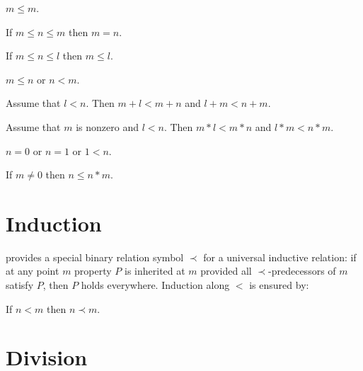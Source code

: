 \documentclass[11pt]{article}
\begin{document}
\begin{forthel}

\begin{lemma} $m \leq m$.
\end{lemma}

\begin{lemma} If $m \leq n \leq m$ 
then $m = n$.
\end{lemma}

\begin{lemma} If $m \leq n \leq l$ 
then  $m \leq l$.
\end{lemma}

\begin{axiom} $m \leq n$ or $n < m$.
\end{axiom}

\begin{lemma} Assume that $l < n$.
  Then $m + l < m + n$ and $l + m < n + m$.
\end{lemma}

\begin{lemma} Assume that $m$ is nonzero and $l < n$.
  Then $m * l < m * n$ and $l * m < n * m$.
\end{lemma}

\begin{axiom} $n = 0$ or $n = 1$ or $1 < n$.
\end{axiom}

\begin{lemma} If $m \neq 0$ then $n \leq n * m$.
\end{lemma}
\end{forthel}

\section{Induction}

\Naproche{} provides a special binary relation
symbol $\prec$ for a universal inductive relation: if at any
point $m$ property $P$ is inherited at $m$ provided all
$\prec$-predecessors of $m$ satisfy $P$, then $P$ holds everywhere.
Induction along $<$ is ensured by:

\begin{forthel}
\begin{axiom} If $n < m$ then $n \prec m$.
\end{axiom}
\end{forthel}

\section{Division}
\end{document}
